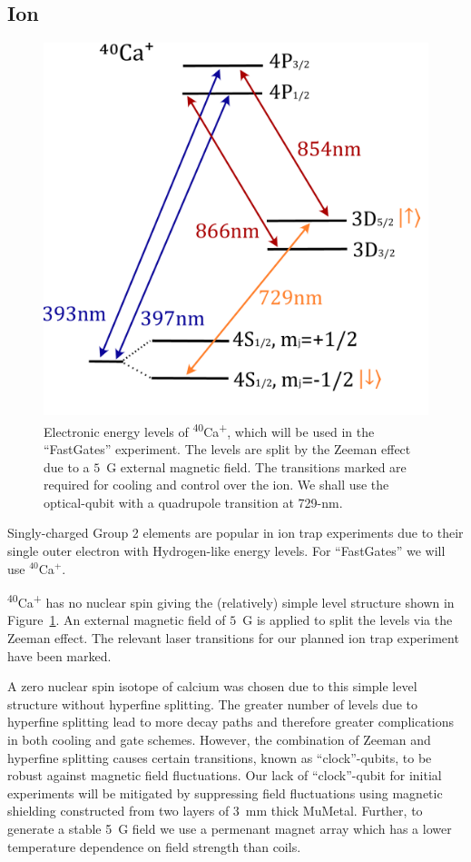 \documentclass[12pt]{iopart}
\begin{document}
\subsection{Ion}
\begin{figure}
  \begin{center}
   \noindent\includegraphics[width=0.4\linewidth]{figures/Ca40.pdf}
  \end{center}
  \caption{
Electronic energy levels of \textsuperscript{40}Ca\textsuperscript{+},
which will be used in the ``FastGates'' experiment. The levels are
split by the Zeeman effect due to a $5$~G external magnetic field. The
transitions marked are required for cooling and control over the
ion. We shall use the optical-qubit with a quadrupole transition at
729-nm.
  }

  \label{fig:ion}
\end{figure}
Singly-charged Group 2 elements are popular in ion trap
experiments due to their single outer electron with Hydrogen-like
energy levels. For ``FastGates'' we will use $^{40}$Ca$^+$.

\textsuperscript{40}Ca\textsuperscript{+} has
no nuclear spin giving the
(relatively) simple level structure shown in Figure~\ref{fig:ion}. An external
magnetic field of $5$~G is applied to split the levels via the Zeeman
effect. The relevant laser transitions for our planned ion trap
experiment have been marked.

A zero nuclear spin isotope of calcium was chosen due to this simple
level structure without hyperfine splitting. The greater number of
levels due to hyperfine splitting lead to more decay paths and
therefore greater complications in both cooling and gate schemes.
However, the combination of Zeeman and hyperfine splitting causes
certain transitions, known as ``clock''-qubits, to be robust against
magnetic field fluctuations. Our lack of ``clock''-qubit for initial
experiments will be mitigated by suppressing field fluctuations using
magnetic shielding constructed from two layers of 3~mm thick
MuMetal. Further, to generate a stable 5~G field we use a permenant
magnet array which has a lower temperature dependence on field
strength than coils.
\end{document}
